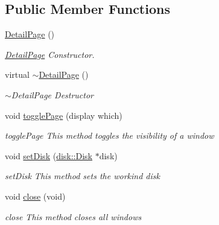 \subsection*{Public Member Functions}
\begin{DoxyCompactItemize}
\item 
\mbox{\hyperlink{class_detail_page_a151e61733c9f0cfbff77d58f161b15bf}{Detail\+Page}} ()
\begin{DoxyCompactList}\small\item\em \mbox{\hyperlink{class_detail_page}{Detail\+Page}} Constructor. \end{DoxyCompactList}\item 
virtual \mbox{\hyperlink{class_detail_page_ab50d547f466fa6b6bba924b79282aae1}{$\sim$\+Detail\+Page}} ()
\begin{DoxyCompactList}\small\item\em $\sim$\+Detail\+Page Destructor \end{DoxyCompactList}\item 
void \mbox{\hyperlink{class_detail_page_a1bbc24ad94c66e55e29ba208586a5bf5}{toggle\+Page}} (display which)
\begin{DoxyCompactList}\small\item\em toggle\+Page This method toggles the visibility of a window \end{DoxyCompactList}\item 
void \mbox{\hyperlink{class_detail_page_a0eb56c55a66d26ca956ebb9f30ca8538}{set\+Disk}} (\mbox{\hyperlink{classdisk_1_1_disk}{disk\+::\+Disk}} $\ast$disk)
\begin{DoxyCompactList}\small\item\em set\+Disk This method sets the workind disk \end{DoxyCompactList}\item 
void \mbox{\hyperlink{class_detail_page_a2eba9774cf72106a5b87357c2348f5ae}{close}} (void)
\begin{DoxyCompactList}\small\item\em close This method closes all windows \end{DoxyCompactList}\end{DoxyCompactItemize}
